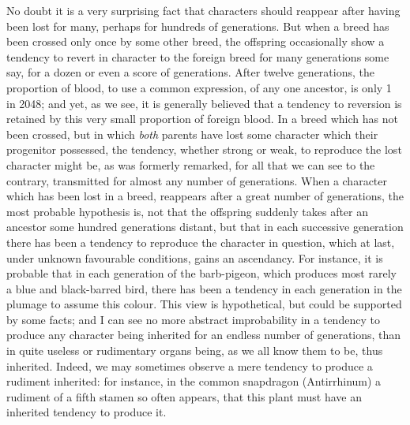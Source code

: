 \indent No doubt it is a very surprising fact that characters should reappear after having been lost for many, perhaps for hundreds of generations. But when a breed has been crossed only once by some other breed, the offspring occasionally show a tendency to revert in character to the foreign breed for many generations some say, for a dozen or even a score of generations. After twelve generations, the proportion of blood, to use a common expression, of any one ancestor, is only 1 in 2048; and yet, as we see, it is generally believed that a tendency to reversion is retained by this very small proportion of foreign blood. In a breed which has not been crossed, but in which \emph{both} parents have lost some character which their progenitor possessed, the tendency, whether strong or weak, to reproduce the lost character might be, as was formerly remarked, for all that we can see to the contrary, transmitted for almost any number of generations. When a character which has been lost in a breed, reappears after a great number of generations, the most probable hypothesis is, not that the offspring suddenly takes after an ancestor some hundred generations distant, but that in each successive generation there has been a tendency to reproduce the character in question, which at last, under unknown favourable conditions, gains an ascendancy. For instance, it is probable that in each generation of the barb-pigeon, which produces most rarely a blue and black-barred bird, there has been a tendency in each generation in the plumage to assume this colour. This view is hypothetical, but could be supported by some facts; and I can see no more abstract improbability in a tendency to produce any character being inherited for an endless number of generations, than in quite useless or rudimentary organs being, as we all know them to be, thus inherited. Indeed, we may sometimes observe a mere tendency to produce a rudiment inherited: for instance, in the common snapdragon (Antirrhinum) a rudiment of a fifth stamen so often appears, that this plant must have an inherited tendency to produce it.\\
